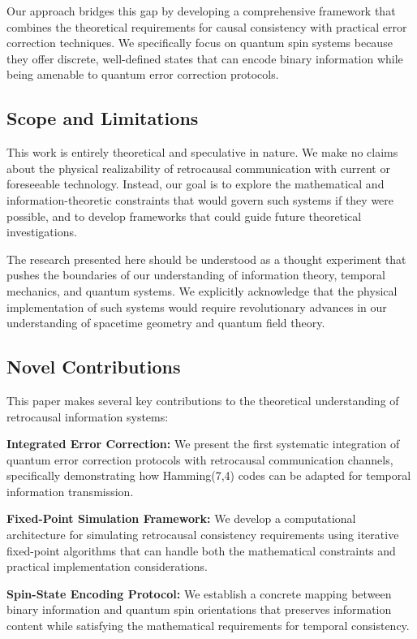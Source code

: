 \documentclass[12pt,a4paper]{article}
\begin{document}
Our approach bridges this gap by developing a comprehensive framework that combines the theoretical requirements for causal consistency with practical error correction techniques. We specifically focus on quantum spin systems because they offer discrete, well-defined states that can encode binary information while being amenable to quantum error correction protocols.

\subsection{Scope and Limitations}

This work is entirely theoretical and speculative in nature. We make no claims about the physical realizability of retrocausal communication with current or foreseeable technology. Instead, our goal is to explore the mathematical and information-theoretic constraints that would govern such systems if they were possible, and to develop frameworks that could guide future theoretical investigations.

The research presented here should be understood as a thought experiment that pushes the boundaries of our understanding of information theory, temporal mechanics, and quantum systems. We explicitly acknowledge that the physical implementation of such systems would require revolutionary advances in our understanding of spacetime geometry and quantum field theory.

\subsection{Novel Contributions}

This paper makes several key contributions to the theoretical understanding of retrocausal information systems:

\textbf{Integrated Error Correction:} We present the first systematic integration of quantum error correction protocols with retrocausal communication channels, specifically demonstrating how Hamming(7,4) codes can be adapted for temporal information transmission.

\textbf{Fixed-Point Simulation Framework:} We develop a computational architecture for simulating retrocausal consistency requirements using iterative fixed-point algorithms that can handle both the mathematical constraints and practical implementation considerations.

\textbf{Spin-State Encoding Protocol:} We establish a concrete mapping between binary information and quantum spin orientations that preserves information content while satisfying the mathematical requirements for temporal consistency.
\end{document}
